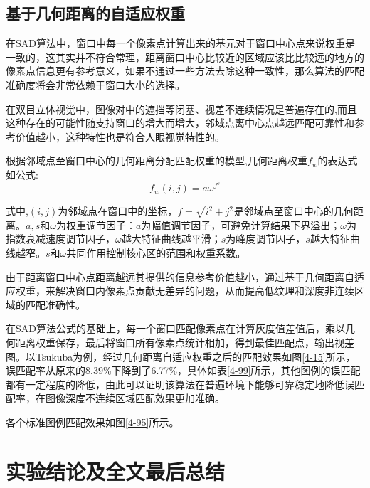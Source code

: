 \subsection{基于几何距离的自适应权重}

在SAD算法中，窗口中每一个像素点计算出来的基元对于窗口中心点来说权重是一致的，这其实并不符合常理，距离窗口中心比较近的区域应该比比较远的地方的像素点信息更有参考意义，如果不通过一些方法去除这种一致性，那么算法的匹配准确度将会非常依赖于窗口大小的选择。

在双目立体视觉中，图像对中的遮挡等闭塞、视差不连续情况是普遍存在的,而且这种存在的可能性随支持窗口的增大而增大，邻域点离中心点越远匹配可靠性和参考价值越小，这种特性也是符合人眼视觉特性的。


根据邻域点至窗口中心的几何距离分配匹配权重的模型,几何距离权重$f_{w}$的表达式如公式: 
\begin{equation}
f_{w}(i,j) = a\omega ^{f^{s}}
\end{equation}

式中,$(i,j)$为邻域点在窗口中的坐标，$f=\sqrt{i^{2}+j^{2}}$是邻域点至窗口中心的几何距离。$a,s$和$\omega$为权重调节因子：$a$为幅值调节因子，可避免计算结果下界溢出；$\omega$为指数衰减速度调节因子，$\omega$越大特征曲线越平滑；$s$为峰度调节因子，$s$越大特征曲线越窄。$s$和$\omega$共同作用控制核心区的范围和权重系数。

由于距离窗口中心点距离越远其提供的信息参考价值越小，通过基于几何距离自适应权重，来解决窗口内像素点贡献无差异的问题，从而提高低纹理和深度非连续区域的匹配准确性。

在SAD算法公式的基础上，每一个窗口匹配像素点在计算灰度值差值后，乘以几何距离权重保存，最后将窗口所有像素点统计相加，得到最佳匹配点，输出视差图。以Tsukuba为例，经过几何距离自适应权重之后的匹配效果如图\ref{4-15}所示，误匹配率从原来的8.39\%下降到了6.77\%，具体如表\ref{4-99}所示，其他图例的误匹配都有一定程度的降低，由此可以证明该算法在普遍环境下能够可靠稳定地降低误匹配率，在图像深度不连续区域匹配效果更加准确。


各个标准图例匹配效果如图\ref{4-95}所示。

\section{实验结论及全文最后总结}

